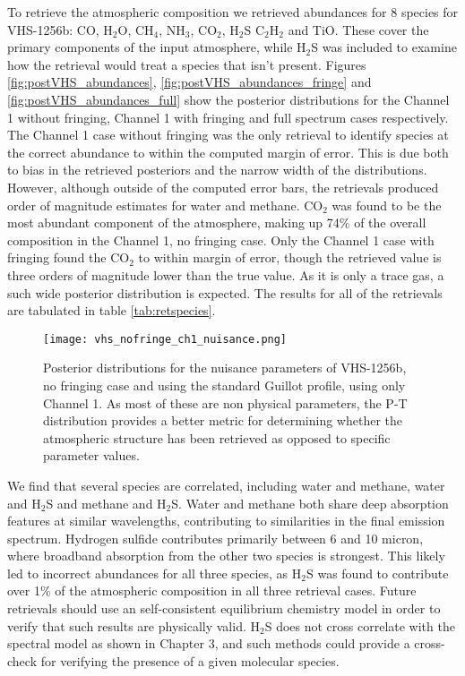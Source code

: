 To retrieve the atmospheric composition we retrieved abundances for 8 species for VHS-1256b: CO, H$_{2}$O, CH$_{4}$, NH$_{3}$, CO$_{2}$, H$_{2}$S C$_{2}$H$_{2}$ and TiO.
These cover the primary components of the input atmosphere, while H$_{2}$S was included to examine how the retrieval would treat a species that isn't present.
Figures \ref{fig:postVHS_abundances}, \ref{fig:postVHS_abundances_fringe} and \ref{fig:postVHS_abundances_full} show the posterior distributions for the Channel 1 without fringing, Channel 1 with fringing and full spectrum cases respectively. 
The Channel 1 case without fringing was the only retrieval to identify species at the correct abundance to within the computed margin of error.
This is due both to bias in the retrieved posteriors and the narrow width of the distributions.
However, although outside of the computed error bars, the retrievals produced order of magnitude estimates for water and methane. 
CO$_{2}$ was found to be the most abundant component of the atmosphere, making up 74\% of the overall composition in the Channel 1, no fringing case.
Only the Channel 1 case with fringing found the CO$_{2}$ to within margin of error, though the retrieved value is three orders of magnitude lower than the true value.
As it is only a trace gas, a such wide posterior distribution is expected.
The results for all of the retrievals are tabulated in table \ref{tab:retspecies}. 

\begin{figure}[t]
	\centering
	\texttt{[image: vhs\_nofringe\_ch1\_nuisance.png]}
	\caption{Posterior distributions for the nuisance parameters of VHS-1256b, no fringing case and using the standard Guillot profile, using only Channel 1. As most of these are non physical parameters, the P-T distribution provides a better metric for determining whether the atmospheric structure has been retrieved as opposed to specific parameter values.}
	\label{fig:postVHS_nuisance}
\end{figure}

We find that several species are correlated, including water and methane, water and H$_{2}$S and methane and H$_{2}$S.
Water and methane both share deep absorption features at similar wavelengths, contributing to similarities in the final emission spectrum.
Hydrogen sulfide contributes primarily between 6 and 10 micron, where broadband absorption from the other two species is strongest.
This likely led to incorrect abundances for all three species, as H$_{2}$S was found to contribute over 1\% of the atmospheric composition in all three retrieval cases.
Future retrievals should use an self-consistent equilibrium chemistry model in order to verify that such results are physically valid. 
H$_{2}$S does not cross correlate with the spectral model as shown in Chapter 3, and such methods could provide a cross-check for verifying the presence of a given molecular species.

